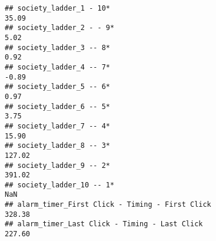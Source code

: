 \documentclass[
]{article}
\begin{document}
\begin{verbatim}
## society_ladder_1 - 10*                                                                                                                                                                                                        35.09
## society_ladder_2 - - 9*                                                                                                                                                                                                        5.02
## society_ladder_3 -- 8*                                                                                                                                                                                                         0.92
## society_ladder_4 -- 7*                                                                                                                                                                                                        -0.89
## society_ladder_5 -- 6*                                                                                                                                                                                                         0.97
## society_ladder_6 -- 5*                                                                                                                                                                                                         3.75
## society_ladder_7 -- 4*                                                                                                                                                                                                        15.90
## society_ladder_8 -- 3*                                                                                                                                                                                                       127.02
## society_ladder_9 -- 2*                                                                                                                                                                                                       391.02
## society_ladder_10 -- 1*                                                                                                                                                                                                         NaN
## alarm_timer_First Click - Timing - First Click                                                                                                                                                                               328.38
## alarm_timer_Last Click - Timing - Last Click                                                                                                                                                                                 227.60

\end{verbatim}
\end{document}
